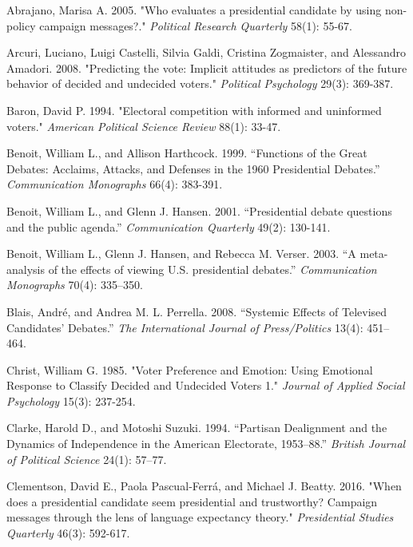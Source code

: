 \documentclass[12pt]{article}
\begin{document}
{{{{\newpage

\begin{thebibliography}{20}
\setlength{\itemindent}{-0.2in} 

 Abrajano, Marisa A. 2005. "Who evaluates a presidential candidate by using non-policy campaign messages?." \emph{Political Research Quarterly} 58(1): 55-67.

 Arcuri, Luciano, Luigi Castelli, Silvia Galdi, Cristina Zogmaister, and Alessandro Amadori. 2008. "Predicting the vote: Implicit attitudes as predictors of the future behavior of decided and undecided voters." \emph{Political Psychology} 29(3): 369-387.

 Baron, David P. 1994. "Electoral competition with informed and uninformed voters." \emph{American Political Science Review} 88(1): 33-47.

 Benoit, William L., and Allison Harthcock. 1999. “Functions of the Great Debates: Acclaims, Attacks, and Defenses in the 1960 Presidential Debates.” \emph{Communication Monographs} 66(4): 383-391.

 Benoit, William L., and Glenn J. Hansen. 2001. “Presidential debate questions and the public agenda.” \emph{Communication Quarterly} 49(2): 130-141. 

 Benoit, William L., Glenn J. Hansen, and Rebecca M. Verser. 2003. “A meta-analysis of the effects of viewing U.S. presidential debates.” \emph{Communication Monographs} 70(4): 335–350.

 Blais, André, and Andrea M. L. Perrella. 2008. “Systemic Effects of Televised Candidates’ Debates.” \emph{The International Journal of Press/Politics} 13(4): 451–464.

 Christ, William G. 1985. "Voter Preference and Emotion: Using Emotional Response to Classify Decided and Undecided Voters 1." \emph{Journal of Applied Social Psychology} 15(3): 237-254.

 Clarke, Harold D., and Motoshi Suzuki. 1994. “Partisan Dealignment and the Dynamics of Independence in the American Electorate, 1953–88.” \emph{British Journal of Political Science} 24(1): 57–77. 

 Clementson, David E., Paola Pascual‐Ferrá, and Michael J. Beatty. 2016. "When does a presidential candidate seem presidential and trustworthy? Campaign messages through the lens of language expectancy theory." \emph{Presidential Studies Quarterly} 46(3): 592-617.


\end{thebibliography}}}}}
\end{document}
